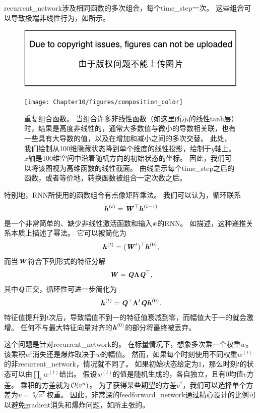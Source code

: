\gls{recurrent_network}涉及相同函数的多次组合，每个\gls{time_step}一次。
这些组合可以导致极端非线性行为，如所示。
\begin{figure}[!htb]
\ifOpenSource
\centerline{\includegraphics{figure.pdf}}
\else
\centerline{\texttt{[image: Chapter10/figures/composition\_color]}}
\fi
\caption{重复组合函数。
当组合许多非线性函数（如这里所示的线性tanh层）时，结果是高度非线性的，通常大多数值与微小的导数相关联，也有一些具有大导数的值，以及在增加和减小之间的多次交替。%
此处，我们绘制从100维隐藏状态降到单个维度的线性投影，绘制于$y$轴上。
$x$轴是100维空间中沿着随机方向的初始状态的坐标。
因此，我们可以将该图视为高维函数的线性截面。
曲线显示每个\gls{time_step}之后的函数，或者等价地，转换函数被组合一定次数之后。
}
\label{fig:chap10_composition_color}
\end{figure}

特别地，\gls{RNN}所使用的函数组合有点像矩阵乘法。
我们可以认为，循环联系
\begin{align}
 \boldsymbol{\mathit{h}}^{(t)} = \boldsymbol{\mathit{W}}^\top \boldsymbol{\mathit{h}}^{(t-1)}
\end{align}
是一个非常简单的、缺少非线性激活函数和输入$\boldsymbol{\mathit{x}}$的\gls{RNN}。
如描述，这种递推关系本质上描述了幂法。
它可以被简化为
\begin{align}
 \boldsymbol{\mathit{h}}^{(t)} = (\boldsymbol{\mathit{W}}^t)^\top \boldsymbol{\mathit{h}}^{(0)},
\end{align}
而当$\boldsymbol{\mathit{W}}$符合下列形式的特征分解
\begin{align}
 \boldsymbol{\mathit{W}} = \boldsymbol{\mathit{Q}} \boldsymbol{\Lambda} \boldsymbol{\mathit{Q}}^\top,
\end{align}
其中$\boldsymbol{\mathit{Q}}$正交，循环性可进一步简化为
\begin{align}
 \boldsymbol{\mathit{h}}^{(t)} = \boldsymbol{\mathit{Q}}^\top \boldsymbol{\Lambda}^t \boldsymbol{\mathit{Q}} \boldsymbol{\mathit{h}}^{(0)}.
\end{align}
特征值提升到$t$次后，导致幅值不到一的特征值衰减到零，而幅值大于一的就会激增。
任何不与最大特征向量对齐的$\boldsymbol{\mathit{h}}^{(0)}$的部分将最终被丢弃。


这个问题是针对\gls{recurrent_network}的。
在标量情况下，想象多次乘一个权重$w$。
该乘积$w^t$消失还是爆炸取决于$w$的幅值。
然而，如果每个时刻使用不同权重$w^{(t)}$的非\gls{recurrent_network}，情况就不同了。
如果初始状态给定为$1$，那么时刻$t$的状态可以由$\prod_t w^{(t)}$给出。
假设$w^{(t)}$的值是随机生成的，各自独立，且有$0$均值$v$方差。
乘积的方差就为$\mathcal{O}(v^n)$。
为了获得某些期望的方差$v^*$，我们可以选择单个方差为$v=\sqrt[n]{v^*}$权重。
因此，非常深的\gls{feedforward_network}通过精心设计的比例可以避免\gls{gradient}消失和爆炸问题，如\cite{Sussillo14}所主张的。

